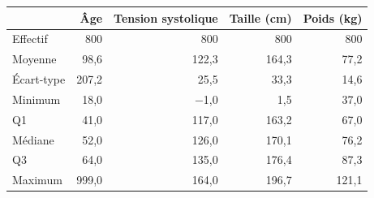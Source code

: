 \begin{tabular}{lrrrr}
\toprule
 & Âge & Tension systolique & Taille (cm) & Poids (kg) \\
\midrule
Effectif & 800 & 800 & 800 & 800 \\
Moyenne & 98,6 & 122,3 & 164,3 & 77,2 \\
Écart-type & 207,2 & 25,5 & 33,3 & 14,6 \\
Minimum & 18,0 & $-$1,0 & 1,5 & 37,0 \\
Q1 & 41,0 & 117,0 & 163,2 & 67,0 \\
Médiane & 52,0 & 126,0 & 170,1 & 76,2 \\
Q3 & 64,0 & 135,0 & 176,4 & 87,3 \\
Maximum & 999,0 & 164,0 & 196,7 & 121,1 \\
\bottomrule
\end{tabular}
